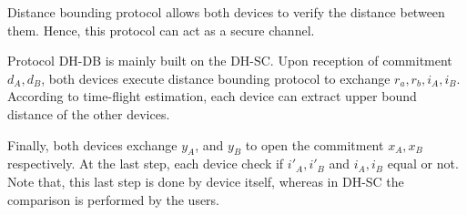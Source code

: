 Distance bounding protocol allows both devices to verify the distance between them. Hence, this protocol can act as a secure channel. 

Protocol DH-DB is mainly built on the DH-SC. Upon reception of commitment $d_A,d_B$, both devices execute distance bounding protocol to exchange $r_a,r_b, i_A, i_B$. According to time-flight estimation, each device can extract upper bound distance of the other devices. 

Finally, both devices exchange $y_A$, and $y_B$ to open the commitment $x_A, x_B$ respectively. At the last step, each device check if $i'_A,i'_B$ and $i_A,i_B$ equal or not.  Note that, this last step is done by device itself, whereas in DH-SC the comparison is performed by the users. 

\begin{center}
\end{center}
